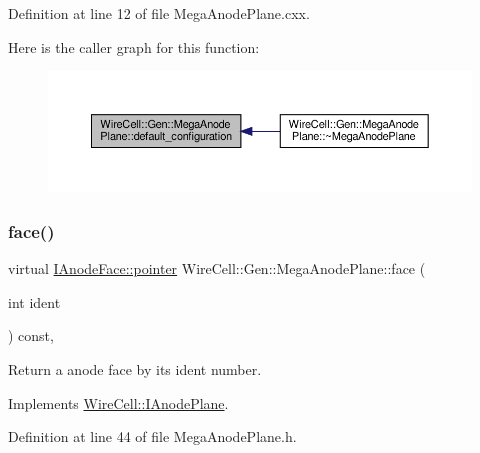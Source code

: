 Definition at line 12 of file Mega\+Anode\+Plane.\+cxx.

Here is the caller graph for this function\+:
\nopagebreak
\begin{figure}[H]
\begin{center}
\leavevmode
\includegraphics[width=350pt]{class_wire_cell_1_1_gen_1_1_mega_anode_plane_a46b1dc962d2894307fa820da9ea5f663_icgraph}
\end{center}
\end{figure}
\mbox{\label{class_wire_cell_1_1_gen_1_1_mega_anode_plane_ad9c13939093664e740ade87c8d89ba94}} 
\subsubsection{\texorpdfstring{face()}{face()}}
{\footnotesize\ttfamily virtual \hyperlink{class_wire_cell_1_1_interface_a09c548fb8266cfa39afb2e74a4615c37}{I\+Anode\+Face\+::pointer} Wire\+Cell\+::\+Gen\+::\+Mega\+Anode\+Plane\+::face (\begin{DoxyParamCaption}\item[{int}]{ident }\end{DoxyParamCaption}) const\hspace{0.3cm}{\ttfamily [inline]}, {\ttfamily [virtual]}}



Return a anode face by its ident number. 



Implements \hyperlink{class_wire_cell_1_1_i_anode_plane_ad420395805cd4a1c07253b535768fd5a}{Wire\+Cell\+::\+I\+Anode\+Plane}.



Definition at line 44 of file Mega\+Anode\+Plane.\+h.

\mbox{\label{class_wire_cell_1_1_gen_1_1_mega_anode_plane_a8f1eacc7a7ec70f52befcaa2c9321591}} 
